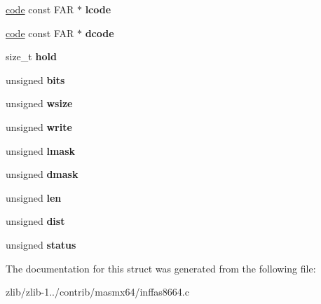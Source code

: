 \begin{DoxyCompactItemize}
\item 
\hypertarget{structinffast__ar_a7c4acb449b263165f6de838a82ea57a2}{\hyperlink{structcode}{code} const F\+A\+R $\ast$ {\bfseries lcode}}\label{structinffast__ar_a7c4acb449b263165f6de838a82ea57a2}

\item 
\hypertarget{structinffast__ar_a4cba48af1f30305f3128d72c90bc1ad3}{\hyperlink{structcode}{code} const F\+A\+R $\ast$ {\bfseries dcode}}\label{structinffast__ar_a4cba48af1f30305f3128d72c90bc1ad3}

\item 
\hypertarget{structinffast__ar_a530e9f7b8f0209f25a182e9213566dcc}{size\+\_\+t {\bfseries hold}}\label{structinffast__ar_a530e9f7b8f0209f25a182e9213566dcc}

\item 
\hypertarget{structinffast__ar_ac76d75fe14ea008e521f2bc2ce1d5e59}{unsigned {\bfseries bits}}\label{structinffast__ar_ac76d75fe14ea008e521f2bc2ce1d5e59}

\item 
\hypertarget{structinffast__ar_aea8bf36d1a700feff5f352a3254769e7}{unsigned {\bfseries wsize}}\label{structinffast__ar_aea8bf36d1a700feff5f352a3254769e7}

\item 
\hypertarget{structinffast__ar_a8340ad468ac7a479c260461270ed5c25}{unsigned {\bfseries write}}\label{structinffast__ar_a8340ad468ac7a479c260461270ed5c25}

\item 
\hypertarget{structinffast__ar_ac35e25838e6392c88726753fc928ec62}{unsigned {\bfseries lmask}}\label{structinffast__ar_ac35e25838e6392c88726753fc928ec62}

\item 
\hypertarget{structinffast__ar_a426c8cbba93c004301f5773c91e3f452}{unsigned {\bfseries dmask}}\label{structinffast__ar_a426c8cbba93c004301f5773c91e3f452}

\item 
\hypertarget{structinffast__ar_a949ba2d6aaf77490aef1fbc510985b3f}{unsigned {\bfseries len}}\label{structinffast__ar_a949ba2d6aaf77490aef1fbc510985b3f}

\item 
\hypertarget{structinffast__ar_a0495c603c07ee75c8d16832b2d70a1f4}{unsigned {\bfseries dist}}\label{structinffast__ar_a0495c603c07ee75c8d16832b2d70a1f4}

\item 
\hypertarget{structinffast__ar_ad769d1cd628970f6b950b196f0b71e3c}{unsigned {\bfseries status}}\label{structinffast__ar_ad769d1cd628970f6b950b196f0b71e3c}

\end{DoxyCompactItemize}


The documentation for this struct was generated from the following file\+:\begin{DoxyCompactItemize}
\item 
zlib/zlib-\/1../contrib/masmx64/inffas8664.\+c\end{DoxyCompactItemize}
